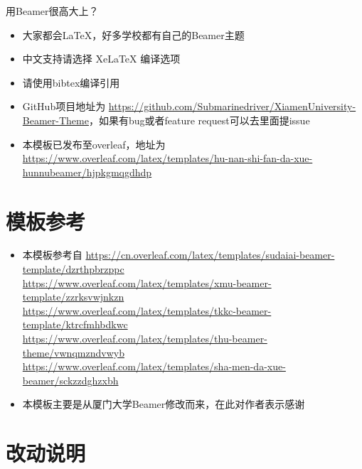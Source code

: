 \documentclass{beamer}
\begin{document}
\begin{frame}{用Beamer很高大上？}
    \begin{itemize}[<+-| alert@+>] %
        \item 大家都会\LaTeX{}，好多学校都有自己的\textrm{Beamer}主题
        \item 中文支持请选择 Xe\LaTeX{} 编译选项
        \item 请使用bibtex编译引用
        \item GitHub项目地址为 \href{https://github.com/Submarinedriver/XiamenUniversity-Beamer-Theme}{https://github.com/Submarinedriver/XiamenUniversity-Beamer-Theme}，如果有bug或者feature request可以去里面提issue
        \item 本模板已发布至overleaf，地址为 \href{https://www.overleaf.com/latex/templates/hu-nan-shi-fan-da-xue-hunnubeamer/hjpkgmqgdhdp}{https://www.overleaf.com/latex/templates/hu-nan-shi-fan-da-xue-hunnubeamer/hjpkgmqgdhdp}
    \end{itemize}
\end{frame}


\section{模板参考}

\begin{frame}
    \begin{itemize}[<+->]
		\item 本模板参考自 \url{https://cn.overleaf.com/latex/templates/sudaiai-beamer-template/dzrthpbrzppc}\cite{origin1}\\
		\url{https://www.overleaf.com/latex/templates/xmu-beamer-template/zzrksvwjnkzn}\cite{origin2}\\
		\url{https://www.overleaf.com/latex/templates/tkkc-beamer-template/ktrcfmhbdkwc}\cite{origin3}\\
		\url{https://www.overleaf.com/latex/templates/thu-beamer-theme/vwnqmzndvwyb}\cite{origin4}\\
		\url{https://www.overleaf.com/latex/templates/sha-men-da-xue-beamer/sckzzdghzxbh}\cite{origin5}
		\item 本模板主要是从厦门大学Beamer修改而来，在此对作者表示感谢
    \end{itemize}
\end{frame}


\section{改动说明}
\end{document}
